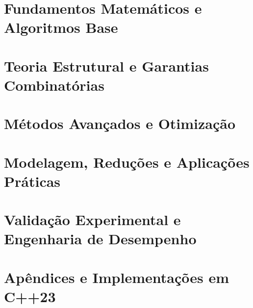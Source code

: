 \documentclass[11pt,a4paper,oneside]{book}
\newcommand{\divisaobloco}[2]{\part{#2}}
\begin{document}
\setlength{\emergencystretch}{3em}



\mainmatter

\divisaobloco{bloco:fundamentos}{Fundamentos Matemáticos e Algoritmos Base}


\divisaobloco{bloco:estrutural}{Teoria Estrutural e Garantias Combinatórias}


\divisaobloco{bloco:avancados}{Métodos Avançados e Otimização}


\divisaobloco{bloco:aplicacoes}{Modelagem, Reduções e Aplicações Práticas}


\divisaobloco{bloco:benchmarks}{Validação Experimental e Engenharia de Desempenho}




\backmatter




\appendix
\part{Apêndices e Implementações em C++23}





\end{document}
